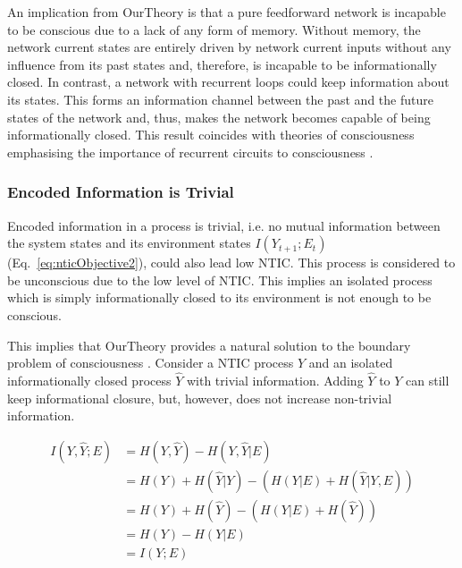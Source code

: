 \documentclass[utf8]{article}
\begin{document}
        		An implication from \ac{OurTheory} is that a pure feedforward network is incapable to be conscious due to a lack of any form of memory. Without memory, the network current states are entirely driven by network current inputs without any influence from its past states and, therefore, is incapable to be informationally closed. In contrast, a network with recurrent loops could keep information about its states. This forms an information channel between the past and the future states of the network and, thus, makes the network becomes capable of being informationally closed. This result coincides with theories of consciousness emphasising the importance of recurrent circuits to consciousness \citep{lamme2006towards, edelman1992bright, tononi2008neural}.
        		


            \subsubsection*{Encoded Information is Trivial}
                Encoded information in a process is trivial, i.e. no mutual information between the system states and its environment states $I(Y_{t+1};E_{t})$ (Eq.~\ref{eq:nticObjective2}), could also lead low NTIC. This process is considered to be unconscious due to the low level of NTIC. This implies an isolated process which is simply informationally closed to its environment is not enough to be conscious. 
                
                This implies that \ac{OurTheory} provides a natural solution to the boundary problem of consciousness \citep{Raymont2006-RAYUOC}. Consider a NTIC process $Y$ and an isolated informationally closed process $\hat{Y}$ with trivial information. Adding $\hat{Y}$ to $Y$ can still keep informational closure, but, however, does not increase non-trivial information. 
                
    			\begin{equation}
    			    \begin{aligned}
                        I(Y,\hat{Y};E) & = H(Y,\hat{Y}) - H(Y,\hat{Y}|E) \\
                                       & = H(Y) + H(\hat{Y}|Y) - (H(Y|E)+H(\hat{Y}|Y,E)) \\
                                       & = H(Y) + H(\hat{Y}) - (H(Y|E)+H(\hat{Y})) \\
                                       & = H(Y) - H(Y|E)\\
                                       & = I(Y;E)				
    				\end{aligned}
    			\end{equation}
                
\end{document}
